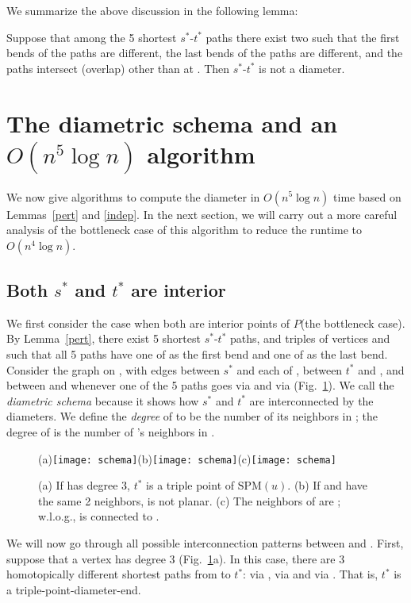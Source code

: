 \documentclass{llncs}
\newif\ifim \imtrue
\newcommand{\e}[1]{\emph{#1}}
\renewcommand\-{\textrm{-}}
\renewcommand{\O}[1]{\ensuremath{O(#1 \log n)}\xspace}
\renewcommand\P{\ensuremath{P}\xspace}
\newcommand{\spm}[1]{\ensuremath{\textrm{SPM}(#1)}\xspace}
\renewcommand\ss{\ensuremath{s^*}\xspace}
\renewcommand\tt{\ensuremath{t^*}\xspace}
\begin{document}
We summarize the above discussion in the following lemma:

\begin{lemma}\label{indep}Suppose that among the 5 shortest \ss-\tt paths there
exist two such that the first bends of the paths are different, the last bends
of the paths are different, and the paths intersect (overlap) other than at
. Then \ss-\tt is not a diameter.\end{lemma}



\section{The diametric schema and an \O{n^5} algorithm}

We now give algorithms to compute the diameter in \O{n^5} time based on
Lemmas~\ref{pert} and \ref{indep}. In the
next section, we will carry out a more careful analysis of the bottleneck case
of this algorithm to reduce the runtime to \O{n^4}.

\subsection{Both \ss and \tt are interior}

We first consider the case when both  are interior points of \P (the bottleneck case). By Lemma~\ref{pert}, there exist 5 shortest \ss-\tt paths, and triples of vertices  and  such that all 5 paths have one of  as the first bend and one of  as the last bend. Consider the graph  on , with edges between \ss and each of , between \tt and , and between  and  whenever one of the 5 paths goes via  and via  (Fig.~\ref{schema}). We call  the \e{diametric schema} because it shows how \ss and \tt are interconnected by the diameters. We define the \e{degree} of  to be the number of its neighbors in ; the degree of  is the number of 's neighbors in .
\begin{figure}\centering
\ifim (a)\texttt{[image: schema]}\hfil(b)\texttt{[image: schema]}\hfil(c)\texttt{[image: schema]}\fi
\caption{(a) If  has degree 3, \tt is a triple point of \spm{u}. (b) If  and  have the same 2 neighbors,  is not planar. (c) The neighbors of  are ; w.l.o.g.,  is connected to .}
\label{schema}\end{figure}

We will now go through all possible interconnection patterns between  and . First, suppose that a vertex  has degree 3 (Fig.~\ref{schema}a). In this case, there are 3 homotopically different shortest paths from  to \tt: via , via  and via . That is, \tt is a triple-point-diameter-end.
\end{document}
